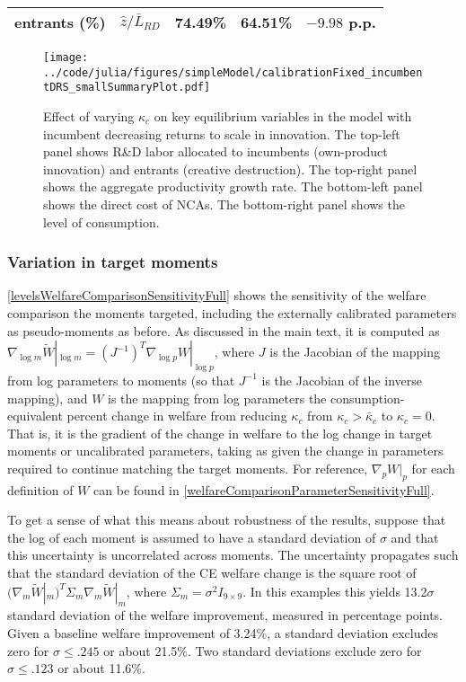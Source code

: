 \documentclass[ecta,nameyear,draft]{econsocart}
\theoremstyle{plain}
\theoremstyle{remark}
\begin{document}
\begin{appendix}
\begin{table}[]
\begin{tabular}{lclll}
		\multicolumn{1}{l}{\quad entrants (\%)}  & $\hat{z} / \bar{L}_{RD}$ & 74.49\% & 64.51\% & $-9.98$ p.p. \tabularnewline
		\bottomrule
	\end{tabular}
\end{table}


\begin{figure}[]
	\centering
	\texttt{[image: ../code/julia/figures/simpleModel/calibrationFixed\_incumbentDRS\_smallSummaryPlot.pdf]}
	\caption{Effect of varying $\kappa_c$ on key equilibrium variables in the model with incumbent decreasing returns to scale in innovation. The top-left panel shows R\&D labor allocated to incumbents (own-product innovation) and entrants (creative destruction). The top-right panel shows the aggregate productivity growth rate. The bottom-left panel shows the direct cost of NCAs. The bottom-right panel shows the level of consumption.}
	\label{calibration_incumbentDRS_summaryPlot}
\end{figure}





\subsubsection{Variation in target moments}

\autoref{levelsWelfareComparisonSensitivityFull} shows the sensitivity of the welfare comparison the moments targeted, including the externally calibrated parameters as pseudo-moments as before. As discussed in the main text, it is computed as $\nabla_{\log m} \tilde{W}|_{\log m} = (J^{-1})^T \nabla_{\log p} W|_{\log p}$, where $J$ is the Jacobian of the mapping from log parameters to moments (so that $J^{-1}$ is the Jacobian of the inverse mapping), and $W$ is the mapping from log parameters the consumption-equivalent percent change in welfare from reducing $\kappa_c$ from $\kappa_c > \bar{\kappa}_c$ to $\kappa_c = 0$. That is, it is the gradient of the change in welfare to the log change in target moments or uncalibrated parameters, taking as given the change in parameters required to continue matching the target moments. For reference, $\nabla_p W|_p$  for each definition of $W$ can be found in \autoref{welfareComparisonParameterSensitivityFull}.

To get a sense of what this means about robustness of the results, suppose that the log of each moment is assumed to have a standard deviation of $\sigma$ and that this uncertainty is uncorrelated across moments. The uncertainty propagates such that the standard deviation of the CE welfare change is the square root of $(\nabla_m \tilde{W}|_m)^T \Sigma_m \nabla_m \tilde{W}|_m$, where $\Sigma_m = \sigma^2 I_{9\times 9}$. In this examples this yields 13.2$\sigma$ standard deviation of the welfare improvement, measured in percentage points. Given a baseline welfare improvement of 3.24\%, a standard deviation excludes zero for $\sigma \le .245$ or about 21.5\%. Two standard deviations exclude zero for $\sigma \le .123$ or about 11.6\%. 


\end{appendix}
\end{document}
